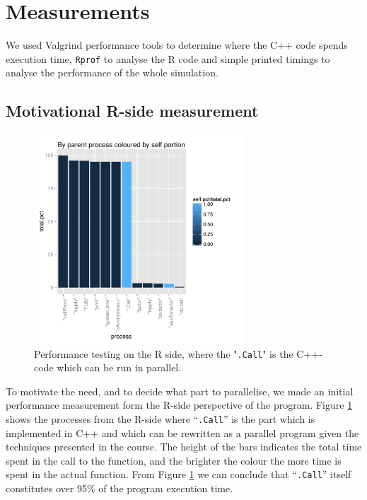 

\section{Measurements}

We used Valgrind performance tools to determine where the C++ code
spends execution time, \texttt{Rprof} to analyse the R code and simple
printed timings to analyse the performance of the whole simulation. 

\subsection{Motivational R-side measurement}

\begin{figure}[!htbp] \centering
  \includegraphics[width=0.7\textwidth]{images/parentColByPortion.pdf}
  \caption{Performance testing on the R side, where the "\texttt{.Call}" is the
C++-code which can be run in parallel.}
  \label{fig:rMot}
\end{figure}

To motivate the need, and to decide what part to parallelise, we made
an initial performance measurement form the R-side perspective of the
program. Figure \ref{fig:rMot} shows the processes from the R-side
where ``\texttt{.Call}'' is the part which is implemented in C++ and
which can be rewritten as a parallel program given the techniques
presented in the course. The height of the bars indicates the total
time spent in the call to the function, and the brighter the colour
the more time is spent in the actual function. From Figure
\ref{fig:rMot} we can conclude that ``\texttt{.Call}'' itself
constitutes over 95\% of the program execution time.

